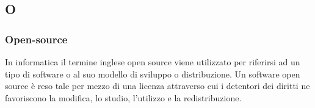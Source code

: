 \subsection*{\textbf{\hfill \Huge{O} \hfill}} 
\subsubsection*{Open-source}
In informatica il termine inglese open source viene utilizzato per riferirsi ad un tipo di software o al suo modello di sviluppo o distribuzione. Un software open source è reso tale per mezzo di una licenza attraverso cui i detentori dei diritti ne favoriscono la modifica, lo studio, l'utilizzo e la redistribuzione.
